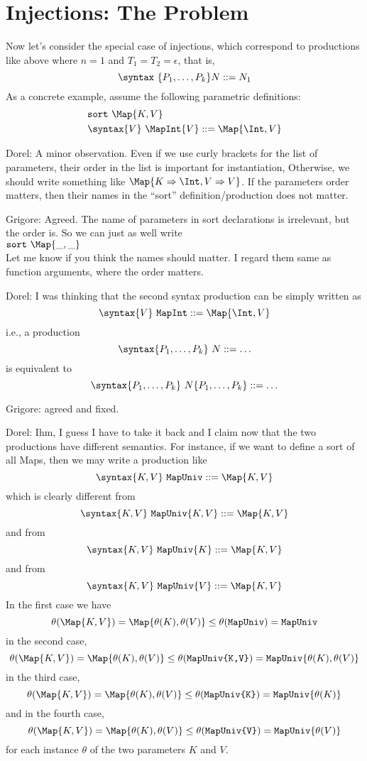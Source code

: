\documentclass{article}
\newcommand\comment[2]{\par\noindent\color{red}#1: #2\color{black}\par\noindent}
\newcommand\dl{\comment{Dorel}}
\newcommand\gr{\comment{Grigore}}
\theoremstyle{definition}
\theoremstyle{definition}
\theoremstyle{definition}
\theoremstyle{definition}
\theoremstyle{definition}
\theoremstyle{theorem}
\theoremstyle{theorem}
\theoremstyle{theorem}
\theoremstyle{theorem}
\theoremstyle{theorem}
\newcommand{\sort}{\texttt{sort}}
\begin{document}
\section{Injections: The Problem}
Now let's consider the special case of injections,
which correspond to productions like above where
\(n=1\) and \(T_1=T_2=\epsilon\), that is,
\[\syntax\ \{P_1,\ldots,P_k\} N::=N_1\]
As a concrete example, assume the following parametric definitions:
\begin{align*}
&\sort\ \Map{K,V}\\
&\syntax\{V\}\ \MapInt{V} ::= \Map{\Int,V}
\end{align*}
\dl{A minor observation. Even if we use curly brackets for the list of parameters, their order in the list is important for instantiation, Otherwise, we should write something like \(\Map{K\Rightarrow \Int, V\Rightarrow V}\). If the parameters order matters, then their names in the ``sort'' definition/production does not matter.}
\gr{Agreed.  The name of parameters in sort declarations is irrelevant, but the order is.  So we can just as well write\\
\(\sort\ \Map{\_,\_}\)\\
Let me know if you think the names should matter.  I regard them same as function arguments, where the order matters.}
\dl{I was thinking that the second syntax production can be simply written as
\[\syntax\{V\}\ \texttt{MapInt} ::= \Map{\Int, V}\]
i.e., a production
\[\syntax\{P_1,\ldots,P_k\}\ N ::= \ldots\]
is equivalent to
\[\syntax\{P_1,\ldots,P_k\}\ N\{P_1,\ldots,P_k\} ::= \ldots\]
}
\gr{agreed and fixed.}
\dl{Ihm, I guess I have to take it back and I claim now that the two productions have different semantics.
For instance, if we want to define a sort of all Maps, then we may write a production like
\[
\syntax\{K,V\}\ \texttt{MapUniv} ::= \Map{K,V}
\]
which is clearly different from
\[
\syntax\{K,V\}\ \texttt{MapUniv}\{K,V\} ::= \Map{K,V}
\]
and from 
\[
\syntax\{K,V\}\ \texttt{MapUniv}\{K\} ::= \Map{K,V}
\]
and from
\[
\syntax\{K,V\}\ \texttt{MapUniv}\{V\} ::= \Map{K,V}
\]
In the first case we have 
\[
\theta(\Map{K,V})=\Map{\theta(K),\theta(V)}\le \theta(\texttt{MapUniv})=\texttt{MapUniv}
\]
in the second case,
\[
\theta(\Map{K,V})=\Map{\theta(K),\theta(V)}\le \theta(\texttt{MapUniv\{K,V\}})=\texttt{MapUniv}\{\theta(K),\theta(V)\}
\]
 in the third case,
 \[
\theta(\Map{K,V})=\Map{\theta(K),\theta(V)}\le \theta(\texttt{MapUniv\{K\}})=\texttt{MapUniv}\{\theta(K)\}
\]
and in the fourth case,
\[
\theta(\Map{K,V})=\Map{\theta(K),\theta(V)}\le \theta(\texttt{MapUniv\{V\}})=\texttt{MapUniv}\{\theta(V)\}
\]
for each instance $\theta$ of the two parameters $K$ and $V$.
}
\end{document}
